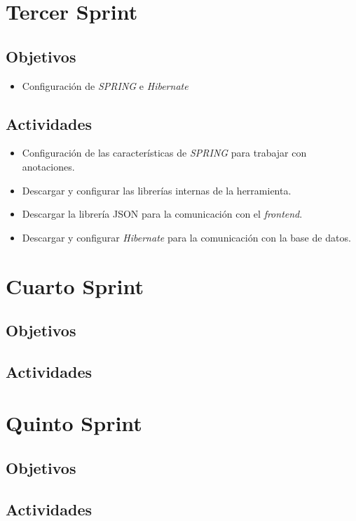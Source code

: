     \section{Tercer Sprint}
        \subsection{Objetivos}
        \begin{itemize}
            \item Configuración de \textit{SPRING} e \textit{Hibernate}
        \end{itemize}
        \subsection{Actividades}
        \begin{itemize}
            \item Configuración de las características de \textit{SPRING} para trabajar con anotaciones.
            \item Descargar y configurar las librerías internas de la herramienta.
            \item Descargar la librería JSON para la comunicación con el \textit{frontend}.
            \item Descargar y configurar \textit{Hibernate} para la comunicación con la base de datos.
        \end{itemize}
        
    \section{Cuarto Sprint}
        \subsection{Objetivos}
        \subsection{Actividades}
        
    \section{Quinto Sprint}
        \subsection{Objetivos}
        \subsection{Actividades}
        

